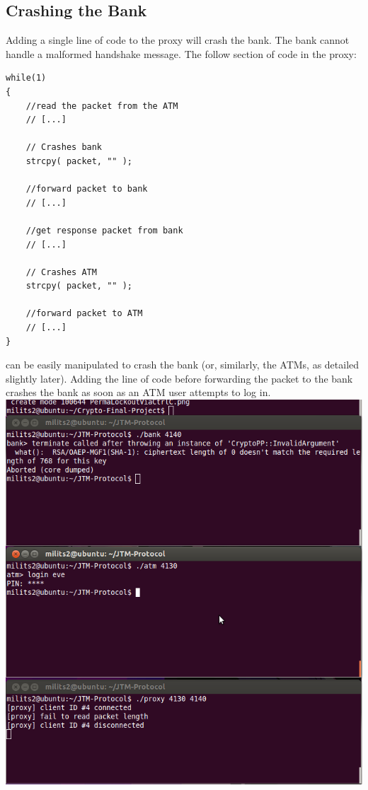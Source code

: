 \documentclass{article}
\begin{document}
\subsection{Crashing the Bank}
Adding a single line of code to the proxy will crash the bank. The bank cannot handle a malformed handshake message. The follow section of code in the proxy:
\begin{lstlisting}
while(1)
{
	//read the packet from the ATM
    // [...]
	
	// Crashes bank
    strcpy( packet, "" );
    
	//forward packet to bank
    // [...]
	
	//get response packet from bank
    // [...]
	
	// Crashes ATM
	strcpy( packet, "" );
	
	//forward packet to ATM
    // [...]
}
\end{lstlisting}
can be easily manipulated to crash the bank (or, similarly, the ATMs, as detailed slightly later). Adding the line of code before forwarding the packet to the bank crashes the bank as soon as an ATM user attempts to log in. 
\\
\includegraphics[scale=0.5]{crashBank.png}
\\
\end{document}
